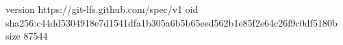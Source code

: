version https://git-lfs.github.com/spec/v1
oid sha256:c44dd5304918e7d1541dfa1b305a6b5b65eed562b1e85f2e64c26f9c0df5180b
size 87544
